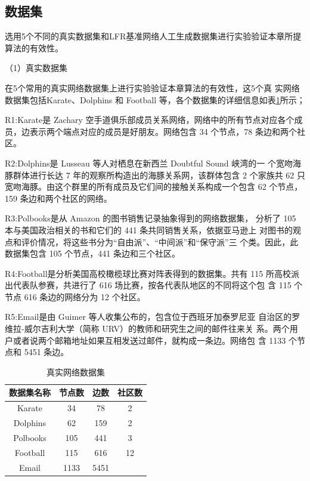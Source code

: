 \subsection{数据集}
选用5个不同的真实数据集和LFR基准网络人工生成数据集进行实验验证本章所提算法的有效性。 

（1）真实数据集

在5个常用的真实网络数据集上进行实验验证本章算法的有效性，这5个真
实网络数据集包括Karate、Dolphins 和 Football 等，各个数据集的详细信息如表\ref{tab:tab3-3}所示；

R1:Karate是 Zachary 空手道俱乐部成员关系网络，网络中的所有节点对应各个成员，边表示两个端点对应的成员是好朋友。网络包含 34 个节点，78 条边和两个社区。 

R2:Dolphins是 Lusseau 等人对栖息在新西兰 Doubtful Sound 峡湾的一
个宽吻海豚群体进行长达 7 年的观察所构造出的海豚关系网，该群体包含 2 个家族共 62 只宽吻海豚。由这个群里的所有成员及它们间的接触关系构成一个包含
62 个节点，159 条边和两个社区的网络。

R3:Polbooks是从 Amazon 的图书销售记录抽象得到的网络数据集，
分析了 105 本与美国政治相关的书和它们的 441 条共同销售关系，依据亚马逊上
对图书的观点和评价情况，将这些书分为“自由派”、“中间派”和“保守派”三
个类。因此，此数据集包含 105 个节点，441 条边和三个社区。

R4:Football是分析美国高校橄榄球比赛对阵表得到的数据集。共有 115
所高校派出代表队参赛，共进行了 616 场比赛，按各代表队地区的不同将这个包
含 115 个节点 616 条边的网络分为 12 个社区。 

R5:Email是由 Guimer 等人收集公布的，包含位于西班牙加泰罗尼亚
自治区的罗维拉-威尔吉利大学（简称 URV）的教师和研究生之间的邮件往来关
系。两个用户或者说两个邮箱地址如果互相发送过邮件，就构成一条边。网络包
含 1133 个节点和 5451 条边。

\begin{table}
  \centering
  \caption{真实网络数据集} \label{tab:tab3-3}
  \begin{tabular*}{0.9\textwidth}{@{\extracolsep{\fill}}cccc}
  \toprule
    数据集名称		&节点数   &边数   &社区数\\
  \midrule
    Karate  &34 &78 &2\\
    Dolphins	&62 &159  &2\\
    Polbooks  &105  &441  &3\\
    Football  &115  &616  &12\\
    Email     &1133 &5451 \\
  \bottomrule
  \end{tabular*}
\end{table}

